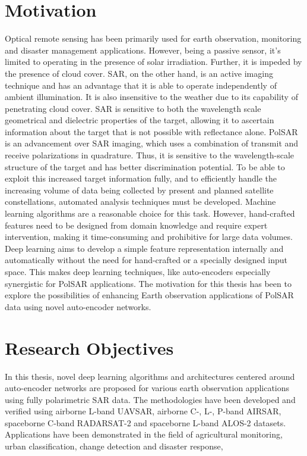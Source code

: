 \documentclass[12pt, a4paper]{article}
\begin{document}
\section{Motivation}

Optical remote sensing has been primarily used for earth observation, monitoring and disaster management applications. However, being a passive sensor, it's limited to operating in the presence of solar irradiation. Further, it is impeded by the presence of cloud cover. SAR, on the other hand, is an active imaging technique and has an advantage that it is able to operate independently of ambient illumination. It is also insensitive to the weather due to its capability of penetrating cloud cover. SAR is sensitive to both the wavelength scale geometrical and dielectric properties of the target, allowing it to ascertain information about the target that is not possible with reflectance alone. PolSAR is an advancement over SAR imaging, which uses a combination of transmit and receive polarizations in quadrature. Thus, it is sensitive to the wavelength-scale structure of the target and has better discrimination potential. To be able to exploit this increased target information fully, and to efficiently handle the increasing volume of data being collected by present and planned satellite constellations, automated analysis techniques must be developed. Machine learning algorithms are a reasonable choice for this task. However, hand-crafted features need to be designed from domain knowledge and require expert intervention, making it time-consuming and prohibitive for large data volumes. Deep learning aims to develop a simple feature representation internally and automatically without the need for hand-crafted or a specially designed input space. This makes deep learning techniques, like auto-encoders especially synergistic for PolSAR applications. The motivation for this thesis has been to explore the possibilities of enhancing Earth observation applications of PolSAR data using novel auto-encoder networks.

\section{Research Objectives}
In this thesis, novel deep learning algorithms and architectures centered around auto-encoder networks are proposed for various earth observation applications using fully polarimetric SAR data.
The methodologies have been developed and verified using airborne L-band UAVSAR, airborne C-, L-, P-band AIRSAR, spaceborne C-band RADARSAT-2 and spaceborne L-band ALOS-2 datasets. Applications have been demonstrated in the field of agricultural monitoring, urban classification, change detection and disaster response, 
\end{document}
